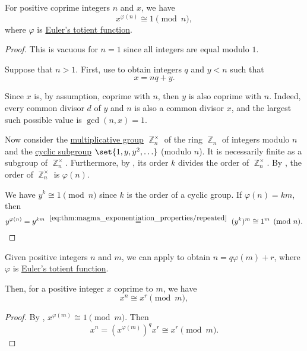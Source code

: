 \begin{theorem}\label{thm:eulers_totient_theorem}
  For positive coprime integers \( n \) and \( x \), we have
  \begin{equation*}
    x^{\varphi(n)} \cong 1 \pmod n,
  \end{equation*}
  where \( \varphi \) is \hyperref[def:eulers_totient_function]{Euler's totient function}.
\end{theorem}
\begin{proof}
  This is vacuous for \( n = 1 \) since all integers are equal modulo \( 1 \).

  Suppose that \( n > 1 \). First, use  to obtain integers \( q \) and \( y < n \) such that
  \begin{equation*}
    x = nq + y.
  \end{equation*}

  Since \( x \) is, by assumption, coprime with \( n \), then \( y \) is also coprime with \( n \). Indeed, every common divisor \( d \) of \( y \) and \( n \) is also a common divisor \( x \), and the largest such possible value is \( \gcd(n, x) = 1 \).

  Now consider the \hyperref[def:semiring]{multiplicative group} \( \BbbZ_n^\times \) of the ring \hyperref[thm:ring_of_integers_modulo]{\( \BbbZ_n \)} of integers modulo \( n \) and the \hyperref[def:cyclic_group]{cyclic subgroup} \( \set{ 1, y, y^2, \ldots } \) (modulo \( n \)). It is necessarily finite as a subgroup of \( \BbbZ_n^\times \). Furthermore, by , its order \( k \) divides the order of \( \BbbZ_n^\times \). By , the order of \( \BbbZ_n^\times \) is \( \varphi(n) \).

  We have \( y^k \cong 1 \pmod n \) since \( k \) is the order of a cyclic group. If \( \varphi(n) = km \), then
  \begin{equation*}
    y^{\varphi(n)}
    =
    y^{km}
    \reloset {\eqref{eq:thm:magma_exponentiation_properties/repeated}} =
    (y^k)^m
    \cong
    1^m
    \pmod n.
  \end{equation*}
\end{proof}

\begin{corollary}\label{thm:division_modulo}
  Given positive integers \( n \) and \( m \), we can apply  to obtain \( n = q \varphi(m) + r \), where \( \varphi \) is \hyperref[def:eulers_totient_function]{Euler's totient function}.

  Then, for a positive integer \( x \) coprime to \( m \), we have
  \begin{equation*}
    x^n \cong x^r \pmod m,
  \end{equation*}
\end{corollary}
\begin{proof}
  By , \( x^{\varphi(m)} \cong 1 \pmod m \). Then
  \begin{equation*}
    x^n = (x^{\varphi(m)})^q x^r \cong x^r \pmod m.
  \end{equation*}
\end{proof}

